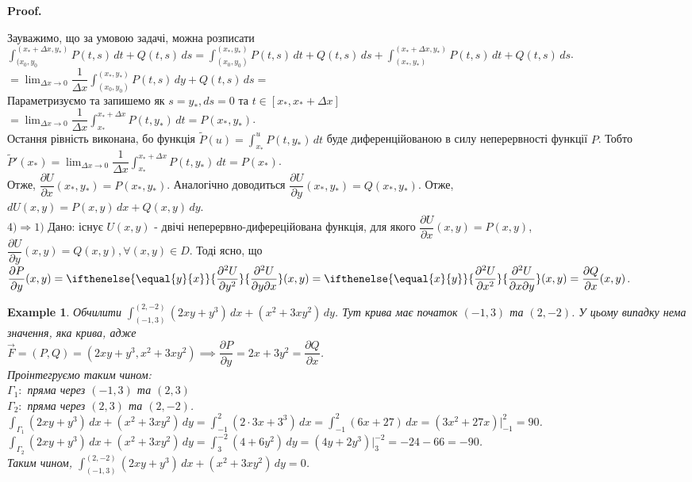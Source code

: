\documentclass[a4paper, 10pt]{article}
\makeatletter
\def\departial#1#2{\dfrac{\partial {#1}}{\partial {#2}}}
\def\seconddepartial#1#2#3{\ifthenelse{\equal{#2}{#3}}{\dfrac{\partial^2 {#1}}{\partial {#2}^2}}{\dfrac{\partial^2 {#1}}{\partial {#2} \partial {#3}}}}
\def\qed{$\blacksquare$}
\theoremstyle{theoremdd}
\theoremstyle{theoremdd}
\theoremstyle{theoremdd}
\theoremstyle{theoremdd}
\newtheorem{example}[theorem]{Example}
\theoremstyle{theoremdd}
\theoremstyle{theoremdd}
\theoremstyle{theoremdd}
\theoremstyle{theoremdd}
\renewenvironment{proof}[1][Proof.\\]{\par
\pushQED{\hfill \qed}%
\normalfont \topsep6\p@\@plus6\p@\relax
\trivlist
\item\relax
{\bfseries
#1\@addpunct{.}}\hspace\labelsep\ignorespaces
}{%
\popQED\endtrivlist\@endpefalse
}
\makeatother
\begin{document}
\begin{proof}
Зауважимо, що за умовою задачі, можна розписати \\ $\displaystyle\int_{(x_0,y_0}^{(x_*+\Delta x, y_*)}P(t,s)\,dt + Q(t,s)\,ds = \int_{(x_0,y_0)}^{(x_*, y_*)}P(t,s)\,dt + Q(t,s)\,ds + \int_{(x_*,y_*)}^{(x_*+\Delta x, y_*)}P(t,s)\,dt + Q(t,s)\,ds$.\\
$\boxed{=} \displaystyle\lim_{\Delta x \to 0} \dfrac{1}{\Delta x} \int_{(x_0,y_0)}^{(x_*,y_*)} P(t,s)\,dy + Q(t,s)\,ds \boxed{=}$\\
Параметризуємо та запишемо як $s = y_*, ds = 0$ та $t \in [x_*, x_*+\Delta x]$\\
$\boxed{=} \displaystyle\lim_{\Delta x \to 0} \dfrac{1}{\Delta x} \int_{x_*}^{x_*+\Delta x} P(t,y_*)\,dt = P(x_*,y_*)$.\\
Остання рівність виконана, бо функція $\tilde{P}(u) = \displaystyle\int_{x_*}^{u} P(t,y_*)\,dt$ буде диференційованою в силу неперервності функції $P$. Тобто $\tilde{P}'(x_*) = \displaystyle\lim_{\Delta x \to 0} \dfrac{1}{\Delta x} \int_{x_*}^{x_*+\Delta x} P(t,y_*)\,dt = P(x_*)$.\\
Отже, $\departial{U}{x}(x_*,y_*) = P(x_*,y_*)$. Аналогічно доводиться $\departial{U}{y}(x_*,y_*) = Q(x_*,y_*)$. Отже,\\
$dU(x,y) = P(x,y)\,dx + Q(x,y)\,dy$.
\bigskip \\
$\boxed{4) \Rightarrow 1)}$ Дано: існує $U(x,y)$ - двічі неперервно-дифереційована функція, для якого $\departial{U}{x}(x,y) = P(x,y)$, $\departial{U}{y}(x,y) = Q(x,y), \forall (x,y) \in D$. Тоді ясно, що\\
$\departial{P}{y}(x,y) = \seconddepartial{U}{y}{x}(x,y) = \seconddepartial{U}{x}{y}(x,y) = \departial{Q}{x}(x,y)$.
\end{proof}

\begin{example}
Обчилити $\displaystyle\int_{(-1,3)}^{(2,-2)} (2xy+y^3)\,dx + (x^2+3xy^2)\,dy$. Тут крива має початок $(-1,3)$ та $(2,-2)$. У цьому випадку нема значення, яка крива, адже\\
$\vec{F} = (P,Q) = (2xy+y^3, x^2+3xy^2) \implies \departial{P}{y} = 2x+3y^2 = \departial{Q}{x}$.\\
Проінтегруємо таким чином: \\
$\Gamma_1:$ пряма через $(-1,3)$ та $(2,3)$\\
$\Gamma_2:$ пряма через $(2,3)$ та $(2,-2)$.\\
$\displaystyle\int_{\Gamma_1} (2xy+y^3)\,dx + (x^2+3xy^2)\,dy = \int_{-1}^2 (2 \cdot 3x + 3^3)\,dx = \int_{-1}^2 (6x+27)\,dx = (3x^2+27x)\Big|_{-1}^2 = 90$.\\
$\displaystyle\int_{\Gamma_2} (2xy+y^3)\,dx + (x^2+3xy^2)\,dy = \int_{3}^{-2} (4+6y^2)\,dy = (4y+2y^3)\Big|_{3}^{-2} = -24 - 66 = -90$.\\
Таким чином, $\displaystyle\int_{(-1,3)}^{(2,-2)} (2xy+y^3)\,dx + (x^2+3xy^2)\,dy = 0$.
\end{example}
\newpage
\end{document}
